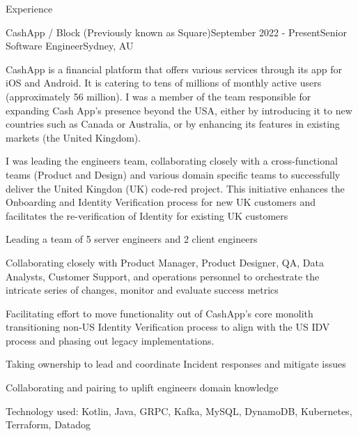 \documentclass[
	11pt, %
]{banguyen-medium-length} %
\begin{document}
\begin{rSection}{Experience}

	\begin{rSubsection}{CashApp / Block (Previously known as Square)}{September
		2022 - Present}{Senior Software Engineer}{Sydney, AU}

	\item CashApp is a financial platform that offers various services through its app
		for iOS and Android. It is catering to tens of millions of monthly active users
		(approximately 56 million). I was a member of the team responsible for expanding
		Cash App's presence beyond the USA, either by introducing it to new countries
		such as Canada or Australia, or by enhancing its features in existing markets
		(the United Kingdom).

		I was leading the engineers team, collaborating closely with a cross-functional teams
		(Product and Design) and various domain specific teams to
		successfully deliver the United Kingdon (UK) code-red project.
		This initiative enhances the Onboarding and Identity Verification process for
		new UK customers and facilitates the re-verification of Identity
		for existing UK customers

		\item Leading a team of 5 server engineers and 2 client engineers
		\item Collaborating closely with Product Manager, Product Designer, QA, Data Analysts, Customer Support, and
			operations personnel to orchestrate the intricate series of changes, monitor and
			evaluate success metrics
		\item Facilitating effort to move functionality out of
			CashApp's core monolith transitioning non-US Identity
			Verification process to align with the US IDV
			process and phasing out legacy implementations.
		\item Taking ownership to lead and coordinate Incident responses and mitigate issues
		\item Collaborating and pairing to uplift engineers domain knowledge
		\item Technology used: Kotlin, Java, GRPC, Kafka, MySQL, DynamoDB, Kubernetes, Terraform, Datadog
	\end{rSubsection}



\end{rSection}
\end{document}
